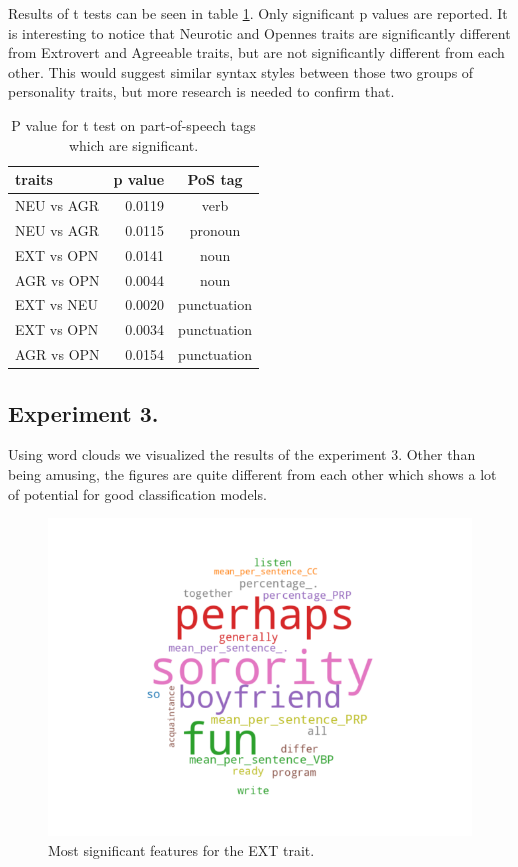 \documentclass[10pt, a4paper]{article}
\begin{document}
Results of t tests can be seen in table \ref{table:ttest}.
Only significant p values are reported.
It is interesting to notice that Neurotic and Opennes traits are significantly different from Extrovert and Agreeable traits, but are not significantly different from each other.
This would suggest similar syntax styles between those two groups of personality traits, but more research is needed to confirm that.

\begin{table}[H]
  \begin{tabular}{lrc}
    \toprule
    traits & p value & PoS tag \\
    \midrule
    NEU vs AGR & 0.0119 & verb \\
    NEU vs AGR & 0.0115 & pronoun \\
    EXT vs OPN & 0.0141 & noun \\
    AGR vs OPN & 0.0044 & noun \\
    EXT vs NEU & 0.0020 & punctuation \\
    EXT vs OPN & 0.0034 & punctuation \\
    AGR vs OPN & 0.0154 & punctuation \\
    \bottomrule
  \end{tabular}
  \caption{P value for t test on part-of-speech tags which are significant.}
  \label{table:ttest}
\end{table}

\subsection{Experiment 3.}

Using word clouds we visualized the results of the experiment 3.
Other than being amusing, the figures are quite different from each other which shows a lot of potential for good classification models.

\begin{figure}
\begin{center}
  \includegraphics[width=\columnwidth]{figures/cEXT.png}
  \caption{Most significant features for the EXT trait.}
  \label{fig:figure1}
\end{center}
\end{figure}
\end{document}
